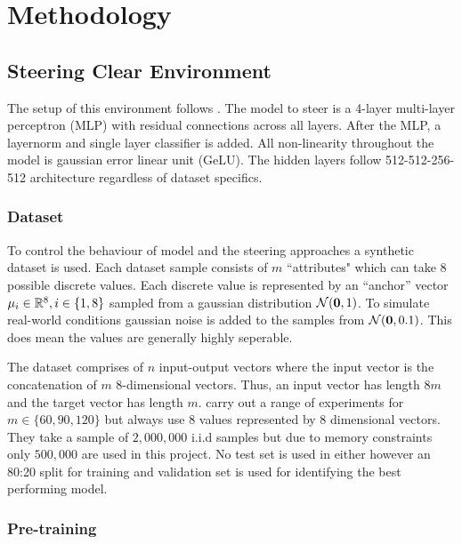\chapter{Methodology}

\section{Steering Clear Environment}
\label{steering-clear}

The setup of this environment follows \citep{steering-clear}.
The model to steer is a 4-layer multi-layer perceptron (MLP) with residual connections \citep{resnet} across all layers.
After the MLP, a layernorm \citep{layernorm} and single layer classifier is added.
All non-linearity throughout the model is gaussian error linear unit (GeLU).
The hidden layers follow 512-512-256-512 architecture regardless of dataset specifics.

\subsection{Dataset}
\label{steering-clear:dataset}

To control the behaviour of model and the steering approaches a synthetic dataset is used.
Each dataset sample consists of $m$ ``attributes" which can take 8 possible discrete values.
Each discrete value is represented by an ``anchor'' vector $\mathbf{\mu}_i \in \mathbb{R}^8, i \in \{1,8\}$ sampled from a gaussian distribution $\mathcal{N}(\mathbf{0}, 1)$.
To simulate real-world conditions gaussian noise is added to the samples from $\mathcal{N}(\mathbf{0}, 0.1)$.
This does mean the values are generally highly seperable.

The dataset comprises of $n$ input-output vectors where the input vector is the concatenation of $m$ 8-dimensional vectors.
Thus, an input vector has length $8m$ and the target vector has length $m$.
\citet{steering-clear} carry out a range of experiments for $m \in \{60, 90, 120\}$ but always use 8 values represented by 8 dimensional vectors.
They take a sample of $2,000,000$ i.i.d samples but due to memory constraints only $500,000$ are used in this project.
No test set is used in either however an 80:20 split for training and validation set is used for identifying the best performing model.

\subsection{Pre-training}

